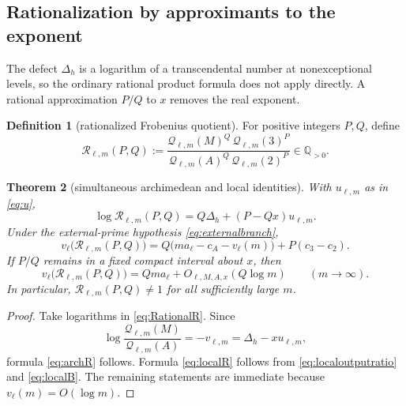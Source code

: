 \documentclass[11pt]{article}
\numberwithin{equation}{section}
\newtheorem{theorem}{Theorem}[section]
\theoremstyle{definition}
\newtheorem{definition}[theorem]{Definition}
\theoremstyle{remark}
\newcommand{\Q}{\mathbb Q}
\begin{document}
\subsection{Rationalization by approximants to the exponent}

The defect $\Delta_h$ is a logarithm of a transcendental number at nonexceptional levels, so the ordinary rational product formula does not apply directly.  A rational approximation $P/Q$ to $x$ removes the real exponent.

\begin{definition}[rationalized Frobenius quotient]\label{def:rationalized}
For positive integers $P,Q$, define
\begin{equation}\label{eq:RationalR}
  \mathscr R_{\ell,m}(P,Q)
  :=
  \frac{\mathcal Q_{\ell,m}(M)^Q\,
        \mathcal Q_{\ell,m}(3)^P}
       {\mathcal Q_{\ell,m}(A)^Q\,
        \mathcal Q_{\ell,m}(2)^P}
  \in\Q_{>0}.
\end{equation}
\end{definition}

\begin{theorem}[simultaneous archimedean and local identities]\label{thm:adelicidentities}
With $u_{\ell,m}$ as in \eqref{eq:u},
\begin{equation}\label{eq:archR}
  \log\mathscr R_{\ell,m}(P,Q)
  =Q\Delta_h+(P-Qx)u_{\ell,m}.
\end{equation}
Under the external-prime hypothesis \eqref{eq:externalbranch},
\begin{equation}\label{eq:localR}
  v_\ell\bigl(\mathscr R_{\ell,m}(P,Q)\bigr)
  =Q\bigl(ma_\ell-c_A-v_\ell(m)\bigr)
   +P(c_3-c_2).
\end{equation}
If $P/Q$ remains in a fixed compact interval about $x$, then
\begin{equation}\label{eq:localRasymp}
  v_\ell\bigl(\mathscr R_{\ell,m}(P,Q)\bigr)
  =Qma_\ell+O_{\ell,M,A,x}(Q\log m)
  \qquad(m\to\infty).
\end{equation}
In particular, $\mathscr R_{\ell,m}(P,Q)\ne1$ for all sufficiently large $m$.
\end{theorem}

\begin{proof}
Take logarithms in \eqref{eq:RationalR}.  Since
\[
  \log\frac{\mathcal Q_{\ell,m}(M)}{\mathcal Q_{\ell,m}(A)}
  =-v_{\ell,m}
  =\Delta_h-xu_{\ell,m},
\]
formula \eqref{eq:archR} follows.  Formula \eqref{eq:localR} follows from \eqref{eq:localoutputratio} and \eqref{eq:localB}.  The remaining statements are immediate because $v_\ell(m)=O(\log m)$.
\end{proof}
\end{document}
